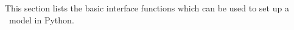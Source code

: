 \documentclass[11pt,a4paper]{book} %
\begin{document}
\newpage

\pagestyle{plain}
%

\clearpage{} 
\tableofcontents

\clearpage
{} 
\setcounter{page}{0}









This section lists the basic interface functions which can be used to set up a \codeName\ model in Python.
\end{document}
